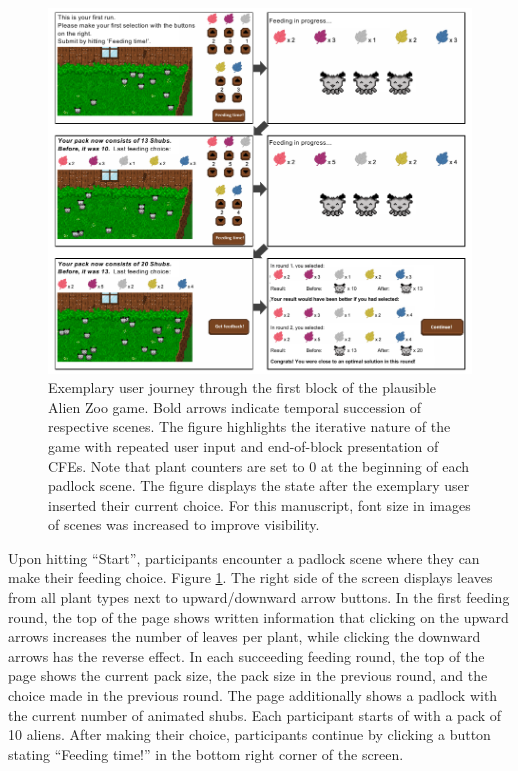 \begin{figure}
   \centering
   \includegraphics[width=\textwidth]{./media/FigureGameInterface.pdf}
   \caption{Exemplary user journey through the first block of the plausible Alien Zoo game. Bold arrows indicate temporal succession of respective scenes. The figure highlights the iterative nature of the game with repeated user input and end-of-block presentation of \glspl{CFE}. Note that plant counters are set to 0 at the beginning of each padlock scene. The figure displays the state after the exemplary user inserted their current choice. For this manuscript, font size in images of scenes was increased to improve visibility.}
   \label{fig:StudyStructure2}
 \end{figure}

Upon hitting ``Start'', participants encounter a padlock scene where they can make their feeding choice.
Figure \ref{fig:StudyStructure2}.
The right side of the screen displays leaves from all plant types next to upward/downward arrow buttons. 
In the first feeding round, the top of the page shows written information that clicking on the upward arrows increases the number of leaves per plant, while clicking the downward arrows has the reverse effect.
In each succeeding feeding round, the top of the page shows the current pack size, the pack size in the previous round, and the choice made in the previous round.
The page additionally shows a padlock with the current number of animated shubs.
Each participant starts of with a pack of 10 aliens.
After making their choice, participants continue by clicking a button stating ``Feeding time!'' in the bottom right corner of the screen.

